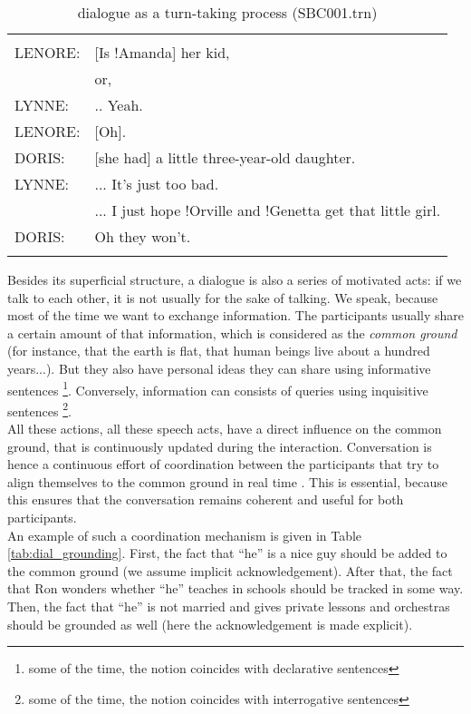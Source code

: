 \documentclass[11pt]{article}
\newenvironment{sbcquote}[2]
{
	\def\savedcaption{\caption{#1}}%
	\def\savedlabel{\label{#2}}%
	\begin{table}[h]
		\centering
		\begin{small}
		\begin{tabular}{ll}
			\hline
			& \\
}
{
	& \\
	\hline
	\end{tabular}
	\end{small}
	\savedcaption
	\savedlabel
\end{table}
}
\begin{document}
			\begin{sbcquote}{dialogue as a turn-taking process (SBC001.trn)}{tab:dial_turn_taking}
				LENORE: & [Is !Amanda] her kid,\\
				& or, \\
				LYNNE: & .. Yeah.\\
				LENORE: & [Oh].\\
				DORIS: & [she had] a little three-year-old daughter.\\
				LYNNE: & ... It's just too bad.\\
				& ... I just hope !Orville and !Genetta get that little girl.\\
				DORIS: & Oh they won't.\\
			\end{sbcquote}


			Besides its superficial structure, a dialogue is also a series of motivated acts: if we talk to each other, it is not usually for the sake of talking. We speak, because most of the time we want to exchange information. The participants usually share a certain amount of that information, which is considered as the \textit{common ground} (for instance, that the earth is flat, that human beings live about a hundred years...). But they also have personal ideas they can share using informative sentences \footnote{some of the time, the notion coincides with declarative sentences}. Conversely, information can consists of queries using inquisitive sentences \footnote{some of the time, the notion coincides with interrogative sentences}.\\
			
			All these actions, all these speech acts, have a direct influence on the common ground, that is continuously updated during the interaction. Conversation is hence a continuous effort of coordination between the participants that try to align themselves to the common ground in real time \cite{poesio1997, eshghi2015}. This is essential, because this ensures that the conversation remains coherent and useful for both participants.\\

			An example of such a coordination mechanism is given in Table \ref{tab:dial_grounding}. First, the fact that ``he'' is a nice guy should be added to the common ground (we assume implicit acknowledgement). After that, the fact that Ron wonders whether ``he'' teaches in schools should be tracked in some way. Then, the fact that ``he'' is not married and gives private lessons and orchestras should be grounded as well (here the acknowledgement is made explicit).\\
			
\end{document}
